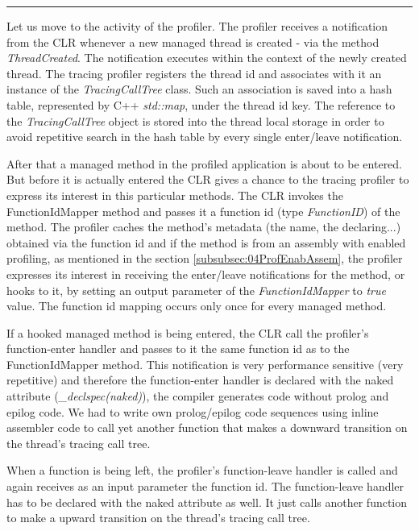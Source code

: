\begin{center}
\rule{300pt}{1.5pt}
\end{center}
Let us move to the activity of the profiler. The profiler receives a notification from the CLR whenever a new managed thread is created - via the method \textit{ThreadCreated}. The notification executes within the context of the newly created thread. The tracing profiler registers the thread id and associates with it an instance of the \textit{TracingCallTree} class. Such an association is saved into a hash table, represented by C++ \textit{std::map}, under the thread id key. The reference to the \textit{TracingCallTree} object is stored into the thread local storage in order to avoid repetitive search in the hash table by every single enter/leave notification.

After that a managed method in the profiled application is about to be entered. But before it is actually entered the CLR gives a chance to the tracing profiler to express its interest in this particular methods. The CLR invokes the FunctionIdMapper method and passes it a function id (type \textit{FunctionID}) of the method. The profiler caches the method's metadata (the name, the declaring...) obtained via the function id and if the method is from an assembly with enabled profiling, as mentioned in the section \ref{subsubsec:04ProfEnabAssem}, the profiler expresses its interest in receiving the enter/leave notifications for the method,  or hooks to it, by setting an output parameter of the \textit{FunctionIdMapper} to \textit{true} value. The function id mapping occurs only once for every managed method.

If a hooked managed method is being entered, the CLR call the profiler's function-enter handler and passes to it the same function id as to the FunctionIdMapper method. This notification is very performance sensitive (very repetitive) and therefore the function-enter handler is declared with the naked attribute (\textit{\_declspec(naked)}), the compiler generates code without prolog and epilog code. We had to write own prolog/epilog code sequences using inline assembler code to call yet another function that makes a downward transition on the thread's tracing call tree.

When a function is being left, the profiler's function-leave handler is called and again receives as an input parameter the function id. The function-leave handler has to be declared with the naked attribute as well. It just calls another function to make a upward transition on the thread's tracing call tree.

